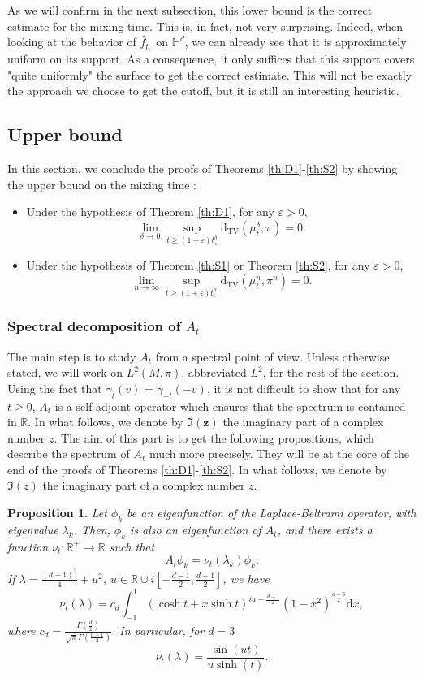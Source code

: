 \documentclass[]{scrartcl}
\newcommand{\DTV}{\mathrm{d_{TV}}}
\newcommand{\R}{\mathds{R}}
\newcommand{\Rp}{\R^{+}}
\newcommand{\eps}{\varepsilon}
\renewcommand{\d}{\mathrm{d}}
\newtheorem{proposition}[theorem]{Proposition}
\numberwithin{equation}{section}
\numberwithin{figure}{section}
\begin{document}
As we will confirm in the next subsection, this lower bound is the correct estimate for the mixing time. This is, in fact, not very surprising. Indeed, when looking at the behavior of $\widetilde{f_{t_{\star}}}$ on $\mathds H^d$, we can already see that it is approximately uniform on its support. As a consequence, it only suffices that this support covers "quite uniformly" the surface to get the correct estimate. This will not be exactly the approach we choose to get the cutoff, but it is still an interesting heuristic.

\subsection{Upper bound} \label{subsec:UB}In this section, we conclude the proofs of Theorems \ref{th:D1}-\ref{th:S2} by showing the upper bound on the mixing time : \begin{itemize}
	\item Under the hypothesis of Theorem \ref{th:D1}, for any $\varepsilon >0$,
	\[\lim_{\delta \to 0}  \sup_{t \geq (1 + \eps) t_\star^\delta} \DTV (\mu^\delta_t,\pi) = 0.\]
	\item Under the hypothesis of Theorem \ref{th:S1} or Theorem \ref{th:S2}, for any $\varepsilon>0$,
	\[\lim_{n \to \infty}  \sup_{t \geq (1+\eps) t_\star^n} \DTV (\mu^n_t,\pi^n) = 0.\]
\end{itemize}

\subsubsection{Spectral decomposition of \texorpdfstring{$A_t$}{A\_t}}
The main step is to study $A_t$ from a spectral point of view. Unless otherwise stated, we will work on $L^2(M, \pi)$, abbreviated $L^2$, for the rest of the section. Using the fact that $\gamma_t(v)$ = $\gamma_{-t}(-v)$, it is not difficult to show that for any $t \geq 0$, $A_t$ is a self-adjoint operator which ensures that the spectrum is contained in $\R$. In what follows, we denote by $\boldsymbol{\Im(z)}$ the imaginary part of a complex number $z$. The aim of this part is to get the following propositions, which describe the spectrum of $A_t$ much more precisely. They will be at the core of the end of the proofs of Theorems \ref{th:D1}-\ref{th:S2}. In what follows, we denote by $\Im(z)$ the imaginary part of a complex number $z$.

\begin{proposition}{}\label{prop:SpAt0}
	Let $\phi_k$ be an eigenfunction of the Laplace-Beltrami operator, with eigenvalue $\lambda_k$. Then, $\phi_k$ is also an eigenfunction of $A_t$, and there exists a function $\nu_t\colon \Rp \to \R$ such that \[A_t\phi_k = \nu_t(\lambda_k)\phi_k.\]
	If $\lambda = \frac{(d-1)^2}{4}+u^2$, $u \in \R \cup i \left[-\frac{d-1}{2}, \frac{d-1}{2}\right]$,
	we have 
$$
\nu_t(\lambda) =  c_d \int_{-1}^1 ( \cosh t  +  x \sinh t  )^{iu - \frac{d-1}{2}}  ( 1 - x^2)^{ \frac{d - 3}{2}} \d x,  
$$
where $c_d = \frac{\Gamma\left( \frac{d}{2}\right)}{\sqrt{\pi} \Gamma\left( \frac{d-1}{2}\right)}$. In particular, for $d=3$ 
$$
\nu_t(\lambda) = \frac{\sin (ut)}{u \sinh (t)}.
$$
\end{proposition}
\end{document}
